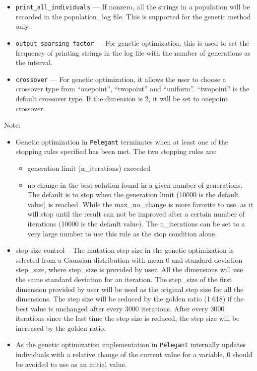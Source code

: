 \documentclass[11pt]{article}
\begin{document}
\begin{itemize}
\item \verb|print_all_individuals| --- If nonzero, all the strings in a population will be recorded in the population\_log file. This is supported for the genetic method only.

\item \verb|output_sparsing_factor| --- For genetic optimization, this is used to set the frequency of printing strings in the log file with the number of generations as the interval.

\item \verb|crossover| --- For genetic optimization, it allows the user to choose a crossover type from ``onepoint'', ``twopoint'' and ``uniform''. ``twopoint'' is the default crossover type. If the dimension is 2, it will be set to onepoint crossover.

\end{itemize}

Note:
\begin{itemize}
\item Genetic optimization in {\tt Pelegant} terminates when at least one of the stopping rules specified has been met. 
The two stopping rules are: 

\begin{itemize}
\item generation limit (n\_iterations) exceeded
\item no change in the best solution found in a given number of generations. 
The default is to stop when the generation limit (10000 is the default value) is reached. While the max\_no\_change is more favorite to use, as it will stop until the result can not be improved after a certain number of iterations (10000 is the default value). The n\_iterations can be set 
to a very large number to use this rule as the stop condition alone.
\end{itemize}

\item step size control -- The mutation step size in the genetic optimization is selected from a Gaussian distribution with mean 0 and standard deviation step\_size, where step\_size is provided by user. All the dimensions will use the same standard deviation for an iteration. The step\_size of the first dimension provided by user will be used as the original step size for all the dimensions. The step size will be reduced by the golden ratio (1.618) if the best value is unchanged after every 3000 iterations. After every 3000 iterations since the last time the step size is reduced, the step size will be increased by the golden ratio.

\item As the genetic optimization implementation in {\tt Pelegant} internally updates individuals with a relative change of the current value for a variable, 0 should be avoided to use as an initial value.

\end{itemize}
\end{document}
